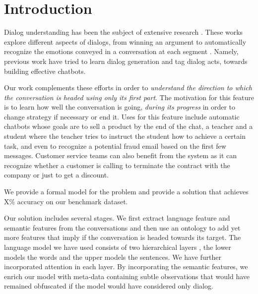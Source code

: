 \section{Introduction}\label{sec:into}
Dialog understanding has been the subject of 
extensive research \cite{BohusR03,BordesW16,GhazvininejadBC17,ShawarA03,DBLP:conf/icassp/JiB05,DBLP:conf/coling/WermterL96}. 
These works explore different aspects of dialogs, from winning an argument \cite{TanNDL16} 
to automatically recognize the emotions conveyed in a conversation at each segment \cite{AyadiKK11}. 
Namely, previous work \cite{...} have tried to learn dialog 
generation and tag dialog acts, towards building effective chatbots. 

Our work complements these efforts in order to {\em understand the 
direction to which the conversation is headed using only its 
first part}. The motivation for this feature is to learn how 
well the conversation is going, {\em during its progress} in order 
to change strategy if necessary or end it. 
Uses for this feature include automatic chatbots whose goals 
are to sell a product by the end of the chat, a teacher and a student 
where the teacher tries to instruct the student how to achieve a certain task, 
and even to recognize a potential fraud email based on the first few 
messages.
Customer service teams can also benefit from the system as it can recognize 
whether a customer is calling to terminate the contract with the company 
or just to get a discount. 

We provide a formal model for the problem and provide a solution 
that achieves X\%  accuracy on our benchmark dataset. 

Our solution includes several stages. 
We first extract language feature and semantic features from the conversations 
and then use an ontology to add yet more features that imply if the conversation 
is headed towards its target. 
The language model we have used consists of two hierarchical layers \cite{DBLP:conf/naacl/YangYDHSH16}, the lower 
models the words and the upper models the sentences. We have further 
incorporated attention \cite{BahdanauCB14} in each layer. 
By incorporating the semantic features, 
we enrich our model with meta-data containing subtle observations 
that would have remained obfuscated if the model would have considered only dialog. 


